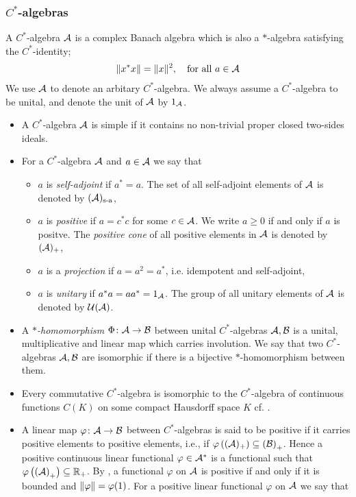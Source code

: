 \subsubsection*{$C^*$-algebras}
A $C^*$-algebra $\mathcal{A}$ is a complex Banach algebra which is also a $*$-algebra satisfying the $C^*$-identity; 
\begin{align*}
\lVert x^*x \rVert = \lVert x\rVert^2, \quad \text{for all } a \in \mathcal{A}
\end{align*}
We use $\mathcal{A}$ to denote an arbitary $C^*$-algebra. We always assume a $C^*$-algebra to be unital, and denote the unit of $\mathcal{A}$ by $1_{\mathcal{A}}$. 
\begin{itemize}
\item A $C^*$-algebra $\mathcal{A}$ is simple if it contains no non-trivial proper closed two-sides ideals.
\item For a $C^*$-algebra $\mathcal{A}$ and $a \in \mathcal{A}$ we say that
\begin{itemize}
\item $a$ is \emph{self-adjoint} if $a^*=a$. The set of all self-adjoint elements of $\mathcal{A}$ is denoted by $(\mathcal{A})_{\text{s-a}}$,
\item $a$ is \emph{positive} if $a=c^*c$ for some $c \in \mathcal{A}$. We write $a \geq 0$ if and only if $a$ is positve. The \emph{positive cone} of all positive elements in $\mathcal{A}$ is denoted by $(\mathcal{A})_{+}$,
\item $a$ is a \emph{projection} if $a=a^2=a^*$, i.e. idempotent and self-adjoint,
\item $a$ is \emph{unitary} if $a^*a=aa^*=1_{\mathcal{A}}$. The group of all unitary elements of $\mathcal{A}$ is denoted by $\mathcal{U}(\mathcal{A})$.
\end{itemize}
\item A \emph{$*$-homomorphism} $\Phi \colon \mathcal{A} \to \mathcal{B}$ between unital $C^*$-algebras $\mathcal{A} , \mathcal{B}$ is a unital, multiplicative and linear map which carries involution. We say that two $C^*$-algebras $\mathcal{A},\mathcal{B}$ are isomorphic if there is a bijective $*$-homomorphism between them.
\item Every commutative $C^*$-algebra is isomorphic to the $C^*$-algebra of continuous functions $C(K)$ on some compact Hausdorff space $K$ cf. \cite[Theorem 9.4][56]{zhu}.
\item A linear map $\varphi \colon \mathcal{A} \to \mathcal{B}$ between $C^*$-algebras is said to be positive if it carries positive elements to positive elements, i.e., if $\varphi\left( (\mathcal{A})_{+} \right) \subseteq \left(\mathcal{B}\right)_+$. Hence a positive continuous linear functional $\varphi \in \mathcal{A}^*$ is a functional such that $\varphi\left( \left( \mathcal{A} \right)_+\right) \subseteq \mathbb{R}_+$. By \cite[Theorem 13.5][79]{zhu}, a functional $\varphi$ on $\mathcal{A}$ is positive if and only if it is bounded and $\lVert \varphi \rVert = \varphi(1)$. For a positive linear functional $\varphi$ on $\mathcal{A}$ we say that

\end{itemize}
